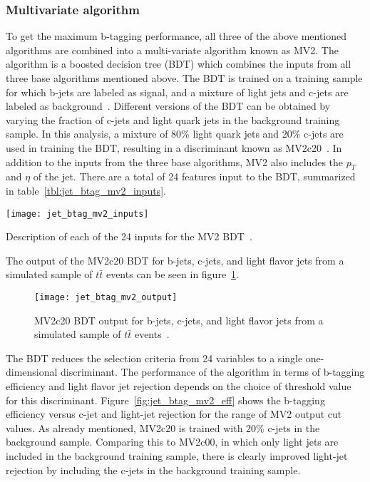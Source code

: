 \subsubsection{Multivariate algorithm}\label{subsubsec:jet_btag_mv2}

To get the maximum b-tagging performance, all three of the above mentioned algorithms are combined into a multi-variate algorithm known as MV2.
The algorithm is a boosted decision tree (BDT) which combines the inputs from all three base algorithms mentioned above.
The BDT is trained on a training sample for which b-jets are labeled as signal, and a mixture of light jets and c-jets are labeled as background~\cite{jet-btag-mv2}.
Different versions of the BDT can be obtained by varying the fraction of c-jets and light quark jets in the background training sample.
In this analysis, a mixture of 80\% light quark jets and 20\% c-jets are used in training the BDT, resulting in a discriminant known as MV2c20~\cite{jet-btag-mv2}.
In addition to the inputs from the three base algorithms, MV2 also includes the $p_T$ and $\eta$ of the jet.
There are a total of 24 features input to the BDT, summarized in table~\ref{tbl:jet_btag_mv2_inputs}.
\begin{table}[!ht]
    \centering
\texttt{[image: jet\_btag\_mv2\_inputs]}
\caption{Description of each of the 24 inputs for the MV2 BDT~\cite{jet-btag-mv2}.}
\label{tbl:jet_btag_mv2_inputs}
\end{table}
The output of the MV2c20 BDT for b-jets, c-jets, and light flavor jets from a simulated sample of $t\bar{t}$ events can be seen in figure~\ref{fig:jet_btag_mv2_output}.

\begin{figure}[!ht]
    \centering
\texttt{[image: jet\_btag\_mv2\_output]}
\caption{MV2c20 BDT output for b-jets, c-jets, and light flavor jets from a simulated sample of $t\bar{t}$ events~\cite{jet-btag-mv2}.}
\label{fig:jet_btag_mv2_output}
\end{figure}

The BDT reduces the selection criteria from 24 variables to a single one-dimensional discriminant.
The performance of the algorithm in terms of b-tagging efficiency and light flavor jet rejection depends on the choice of threshold value for this discriminant.
Figure~\ref{fig:jet_btag_mv2_eff} shows the b-tagging efficiency versus c-jet and light-jet rejection for the range of MV2 output cut values.
As already  mentioned, MV2c20 is trained with 20\% c-jets in the background sample.
Comparing this to MV2c00, in which only light jets are included in the background training sample, there is clearly improved light-jet rejection by including the c-jets in the background training sample.

